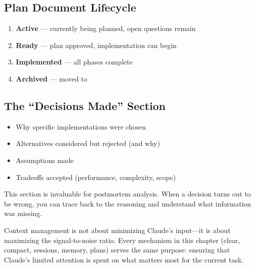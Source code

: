 \subsection{Plan Document Lifecycle}


\begin{enumerate}
  \item \textbf{Active} --- currently being planned, open questions remain
  \item \textbf{Ready} --- plan approved, implementation can begin
  \item \textbf{Implemented} --- all phases complete
  \item \textbf{Archived} --- moved to 
\end{enumerate}

\subsection{The ``Decisions Made'' Section}


\begin{itemize}
  \item Why specific implementations were chosen
  \item Alternatives considered but rejected (and why)
  \item Assumptions made
  \item Tradeoffs accepted (performance, complexity, scope)
\end{itemize}

This section is invaluable for postmortem analysis.
When a decision turns out to be wrong, you can trace back to the reasoning
and understand what information was missing.

\begin{keyinsight}
Context management is not about minimizing Claude's input---it is about
maximizing the signal-to-noise ratio. Every mechanism in this chapter
(clear, compact, sessions, memory, plans) serves the same purpose:
ensuring that Claude's limited attention is spent on what matters most
for the current task.
\end{keyinsight}
